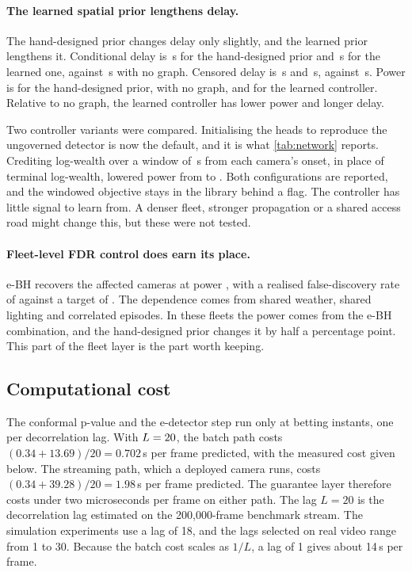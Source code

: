 \paragraph{The learned spatial prior lengthens delay.}
The hand-designed prior changes delay only slightly, and the learned prior lengthens it. Conditional delay is \NetHeuristicDelaySec\,s for the hand-designed prior and \NetGnnDelaySec\,s for the learned one, against \NetNoGraphDelaySec\,s with no graph. Censored delay is \NetHeuristicCensDelaySec\,s
and \NetGnnCensDelaySec\,s, against \NetNoGraphCensDelaySec\,s. Power is
\NetHeuristicPower{} for the hand-designed prior, \NetNoGraphPower{} with no graph,
and \NetGnnPower{} for the learned controller. Relative to no graph, the learned controller has lower power and longer delay.

Two controller variants were compared. Initialising the heads to reproduce
the ungoverned detector is now the default, and it is what \cref{tab:network}
reports. Crediting log-wealth over a window of \NetCreditWindowSec\,s from each camera's onset, in place of terminal log-wealth, lowered power from
\NetGnnPower{} to \NetGnnWindowedPower{}. Both configurations are reported, and
the windowed objective stays in the library behind a flag. The controller has
little signal to learn from. A denser fleet, stronger propagation or a shared
access road might change this, but these were not tested.

\paragraph{Fleet-level FDR control does earn its place.}
e-BH recovers the affected cameras at power \NetNoGraphPower{}, with a realised
false-discovery rate of \NetNoGraphFdr{} against a target of \NetFdrLevel{}. The
dependence comes from shared weather, shared lighting and correlated episodes.
In these fleets the power comes from the e-BH combination, and the hand-designed prior changes it by half a percentage point. This part of the fleet layer is the part worth keeping.

\subsection{Computational cost}
\label{sec:compute}


The conformal p-value and the e-detector step run only at betting instants,
one per decorrelation lag. With $L=20{}$, the batch path costs
$(0.34+13.69)/20 = 0.702$\,\textmu s per frame predicted, with the measured cost
given below. The streaming path, which a deployed camera runs, costs
$(0.34+39.28)/20 = 1.98$\,\textmu s per frame predicted. The guarantee layer therefore
costs under two microseconds per frame on either path. The lag $L=20$ is the
decorrelation lag estimated on the 200{,}000-frame benchmark stream. The simulation
experiments use a lag of 18, and the lags selected on real video range from 1 to
30. Because the batch cost scales as $1/L$, a lag of 1 gives about 14\,\textmu s per
frame.

